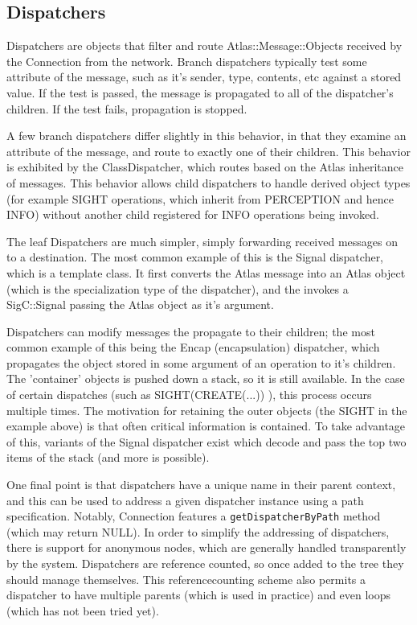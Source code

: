 \subsection{Dispatchers}



Dispatchers are objects that filter and route Atlas::Message::Objects received by the Connection
from the network. Branch dispatchers typically test some attribute of the message, such as it's
sender, type, contents, etc against a stored value. If the test is passed, the message is
propagated to all of the dispatcher's children. If the test fails, propagation is stopped.



A few branch dispatchers differ slightly in this behavior, in that they examine an
attribute of the message, and route to exactly one of their children. This behavior is exhibited
by the ClassDispatcher, which routes based on the Atlas inheritance of messages. This
behavior allows child dispatchers to handle derived object types (for example SIGHT operations, which
inherit from PERCEPTION and hence INFO) without another child registered for INFO operations being invoked.



The leaf Dispatchers are much simpler, simply forwarding received messages
on to a destination. The most common example of this is the Signal dispatcher, which
is a template class. It first converts the Atlas message into an Atlas object (which
is the specialization type of the dispatcher), and the invokes a SigC::Signal passing
the Atlas object as it's argument.



Dispatchers can modify messages the propagate to their children; the most common
example of this being the Encap (encapsulation) dispatcher, which propagates the object
stored in some argument of an operation to it's children. The 'container' objects is pushed
down a stack, so it is still available. In the case of certain dispatches
(such as SIGHT(CREATE(...)) ), this process occurs multiple times. The motivation for retaining
the outer objects (the SIGHT in the example above) is that often critical information is
contained. To take advantage of this, variants of the Signal dispatcher exist which
decode and pass the top two items of the stack (and more is possible).



One final point is that dispatchers have a unique name in their parent context, and
this can be used to address a given dispatcher instance using a path specification. Notably,
Connection features a {\tt getDispatcherByPath} method (which may return NULL). In order
to simplify the addressing of dispatchers, there is support for anonymous nodes, which
are generally handled transparently by the system. Dispatchers are reference counted,
so once added to the tree they should manage themselves. This referencecounting scheme
also permits a dispatcher to have multiple parents (which is used in practice) and even
loops (which has not been tried yet).



